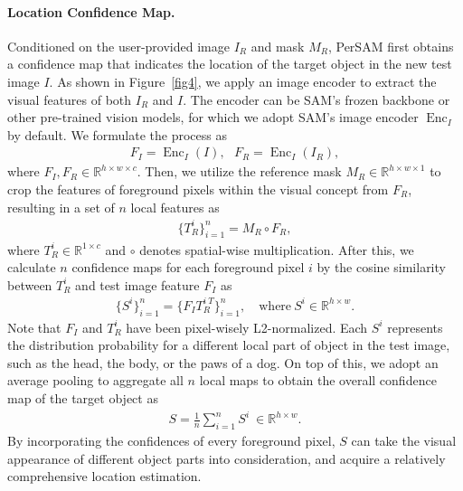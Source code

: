 \documentclass{article} \usepackage{iclr2024_conference,times}
\begin{document}
\paragraph{Location Confidence Map.}
Conditioned on the user-provided image $I_R$ and mask $M_R$, PerSAM first obtains a confidence map that indicates the location of the target object in the new test image $I$.
As shown in Figure~\ref{fig4}, we apply an image encoder to extract the visual features of both $I_R$ and $I$. The encoder can be SAM's frozen backbone or other pre-trained vision models, for which we adopt SAM's image encoder $\operatorname{Enc}_I$ by default. We formulate the process as
\begin{align}
    F_I = \operatorname{Enc}_I(I),\ \ \ F_R = \operatorname{Enc}_I(I_R),
\end{align}
where $F_I, F_R \in \mathbb{R}^{h\times w\times c}$.
Then, we utilize the reference mask $M_R \in \mathbb{R}^{h\times w\times 1}$ to crop the features of foreground pixels within the visual concept from $F_R$, resulting in a set of $n$ local features as
\begin{align}
    \{T_R^i\}_{i=1}^n = M_R \circ F_R,
\end{align}
where $T_R^i \in \mathbb{R}^{1\times c}$ and $\circ$ denotes spatial-wise multiplication. After this, we calculate $n$ confidence maps for each foreground pixel $i$ by the cosine similarity between $T_R^i$ and test image feature $F_I$ as
\begin{align}
    \{S^i\}_{i=1}^n = \{F_I T_R^{i\ T}\}_{i=1}^n,\quad \text{where}\ S^i \in \mathbb{R}^{h\times w}.
\end{align}
Note that $F_I$ and $T_R^i$ have been pixel-wisely L2-normalized. Each $S^i$ represents the distribution probability for a different local part of object in the test image, such as the head, the body, or the paws of a dog. On top of this, we adopt an average pooling to aggregate all $n$ local maps to obtain the overall confidence map of the target object as 
\begin{align}
    S = \frac{1}{n}\sum_{i=1}^nS^i\ \in \mathbb{R}^{h\times w}.
\label{sim}
\end{align}
By incorporating the confidences of every foreground pixel, $S$ can take the visual appearance of different object parts into consideration, and acquire a relatively comprehensive location estimation.
\end{document}
